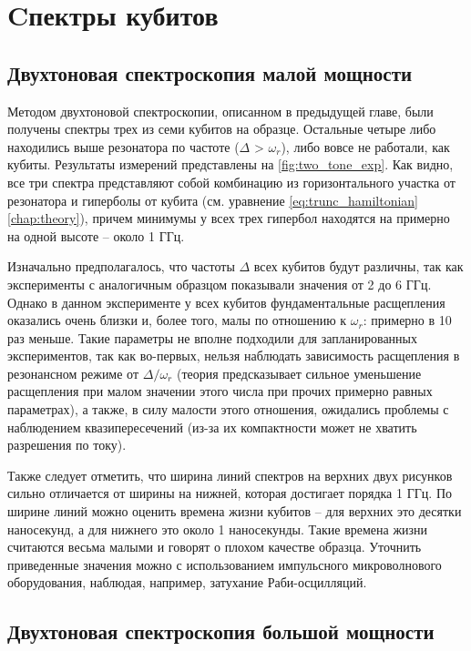 \documentclass[12pt, twoside]{report}
\numberwithin{equation}{section}
\numberwithin{figure}{section}
\begin{document}
\section{Cпектры кубитов}

\subsection{Двухтоновая спектроскопия малой мощности}
 
Методом двухтоновой спектроскопии, описанном в предыдущей главе, были получены спектры трех из семи кубитов на образце. Остальные четыре либо находились выше резонатора по частоте ($\Delta$ > $\omega_r$), либо вовсе не работали, как кубиты. Результаты измерений представлены на \autoref{fig:two_tone_exp}. Как видно, все три спектра представляют собой комбинацию из горизонтального участка от резонатора и гиперболы от кубита (см. уравнение \eqref{eq:trunc_hamiltonian} \autoref{chap:theory}), причем минимумы у всех трех гипербол находятся на примерно на одной высоте -- около 1 ГГц. 

Изначально предполагалось, что частоты $\Delta$ всех кубитов будут различны, так как эксперименты с аналогичным образцом\cite{Jerger2013} показывали значения от 2 до 6 ГГц. Однако в данном эксперименте у всех кубитов фундаментальные расщепления оказались очень близки и, более того, малы по отношению к $\omega_r$: примерно в 10 раз меньше. Такие параметры не вполне подходили для запланированных экспериментов, так как во-первых, нельзя наблюдать зависимость расщепления в резонансном режиме от $\Delta/\omega_r$ (теория предсказывает сильное уменьшение расщепления при малом значении этого числа при прочих примерно равных параметрах), а также, в силу малости этого отношения, ожидались проблемы с наблюдением квазипересечений (из-за их компактности может не хватить разрешения по току). 

Также следует отметить, что ширина линий спектров на верхних двух рисунков сильно отличается от ширины на нижней, которая достигает порядка 1 ГГц. По ширине линий можно оценить времена жизни кубитов -- для верхних это десятки наносекунд, а для нижнего это около 1 наносекунды. Такие времена жизни считаются весьма малыми и говорят о плохом качестве образца. Уточнить приведенные значения можно с использованием импульсного микроволнового оборудования, наблюдая, например, затухание Раби-осцилляций.

\subsection{Двухтоновая спектроскопия большой мощности} 
\end{document}
